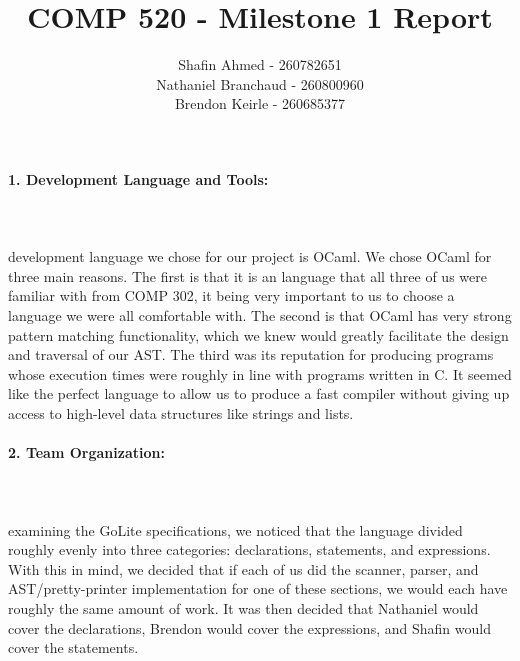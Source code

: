 \documentclass{article}
\begin{document}
\title{COMP 520 - Milestone 1 Report}
\author{Shafin Ahmed - 260782651\\Nathaniel Branchaud - 260800960\\Brendon Keirle - 260685377}
\maketitle
\paragraph{1. Development Language and Tools:}\mbox{}\\\\
 development language we chose for our project is OCaml. We chose OCaml for three main reasons. The first is that it is an language that all three of us were familiar with from COMP 302, it being very important to us to choose a language we were all comfortable with. The second is that OCaml has very strong pattern matching functionality, which we knew would greatly facilitate the design and traversal of our AST. The third was its reputation for producing programs whose execution times were roughly in line with programs written in C. It seemed like the perfect language to allow us to produce a fast compiler without giving up access to high-level data structures like strings and lists.\\
\indent{}
\paragraph{2. Team Organization:}\mbox{}\\\\
 examining the GoLite specifications, we noticed that the language divided roughly evenly into three categories: declarations, statements, and expressions. With this in mind, we decided that if each of us did the scanner, parser, and AST/pretty-printer implementation for one of these sections, we would each have roughly the same amount of work. It was then decided that Nathaniel would cover the declarations, Brendon would cover the expressions, and Shafin would cover the statements.
\end{document}
